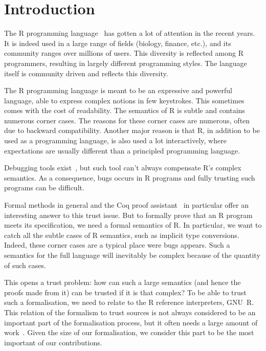 \documentclass[
    sigplan,
    10pt,
    review, %
    natbib=false %
 ]{acmart}
\newcommand{\mb}[1]{\todo[color=purple!20,size=\scriptsize]{#1}}
\begin{document}

\maketitle

\section{Introduction}
\label{sec:intro}

The R programming language~\parencite{R, ihaka1996r, Rwebsite}
has gotten a lot of attention in the recent years.
It is indeed used in a large range of fields (biology, finance, etc.),
and its community ranges over millions of users.
This diversity is reflected among R programmers,
resulting in largely different programming styles.
The language itself is community driven and reflects this diversity.

The R programming language is meant to be an expressive and powerful language,
able to express complex notions in few keystrokes.
This sometimes comes with the cost of readability.
The semantics of R is subtle and contains numerous corner cases.
The reasons for these corner cases are numerous,
often due to backward compatibility.
Another major reason is that R,
in addition to be used as a programming language,
is also used a lot interactively,
where expectations are usually different than a principled programming language.

\mb{An small example would be nice here.}
Debugging tools exist~\parencite{mcpherson2014},
but such tool can’t always compensate R’s complex semantics.
As a consequence, bugs occurs in R programs
and fully trusting such programs can be difficult.

Formal methods in general and the Coq proof assistant~\parencite{Coq}
in particular offer an interesting answer to this trust issue.
But to formally prove that an R program meets its specification,
we need a formal semantics of R.
In particular, we want to catch all the subtle cases of R semantics,
such as implicit type conversions.
Indeed, these corner cases are a typical place were bugs appears.
Such a semantics for the full language will inevitably be complex
because of the quantity of such cases.

This opens a trust problem:
how can such a large semantics (and hence the proofs made from it)
can be trusted if it is that complex?
To be able to trust such a formalisation,
we need to relate to the R reference interpreters, GNU~R.
This relation of the formalism to trust sources
is not always considered to be an important part of the formalisation process,
but it often needs a large amount of work~\parencite{leroy2014pip}.
Given the size of our formalisation,
we consider this part to be the most important of our contributions.
\end{document}
